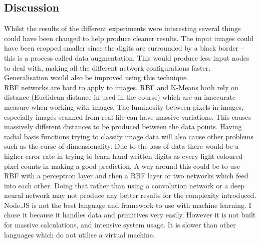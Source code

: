 \documentclass[11pt]{article}
\begin{document}
\begin{page}
\section{Discussion}
Whilst the results of the different experiments were interesting several things could have been changed to help produce cleaner results. The input images could have been cropped smaller since the digits are surrounded by a black border – this is a process called data augmentation. This would produce less input nodes to deal with, making all the different network configurations faster. Generalisation would also be improved using this technique.\\

\noindent RBF networks are hard to apply to images. RBF and K-Means both rely on distance (Euclidean distance in used in the course) which are an inaccurate measure when working with images. The luminosity between pixels in images, especially images scanned from real life can have massive variations. This causes massively different distances to be produced between the data points. Having radial basis functions trying to classify image data will also cause other problems such as the curse of dimensionality. Due to the loss of data there would be a higher error rate in trying to learn hand written digits as every light coloured pixel counts in making a good prediction. A way around this could be to use RBF with a perceptron layer and then a RBF layer or two networks which feed into each other. Doing that rather than using a convolution network or a deep neural network may not produce any better results for the complexity introduced.
\\

\noindent Node.JS is not the best language and framework to use with machine learning. I chose it because it handles data and primitives very easily. However it is not built for massive calculations, and intensive system usage. It is slower than other languages which do not utilise a virtual machine.

\end{page}
\end{document}
